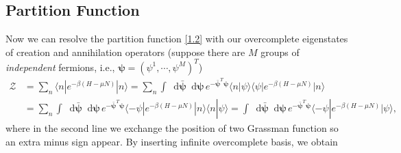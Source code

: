 \documentclass[10pt,nofootinbib]{revtex4}
\newcommand*\dd{\mathop{}\!\mathrm{d}}
\begin{document}
	\subsection{Partition Function}
	Now we can resolve the partition function \eqref{1.2} with our overcomplete eigenstates of creation and annihilation operators (suppose there are $M$ groups of \emph{independent} fermions, i.e., $\bm{\psi}=(\psi^1,\cdots,\psi^M)^T$)
	\begin{align*}
		\mathcal{Z}&=\sum_n\langle n|e^{-\beta(H-\mu N)}|n\rangle=\sum_n\int\dd\bm{\bar\psi}\dd\bm{\psi}\,e^{-\bm{\bar\psi}^T\bm{\psi}}\langle n|\psi\rangle\langle\psi|e^{-\beta(H-\mu N)}|n\rangle\\
		&=\sum_n\int\dd\bm{\bar\psi}\dd\bm{\psi}\,e^{-\bm{\bar\psi}^T\bm{\psi}}\langle-\psi|e^{-\beta(H-\mu N)}|n\rangle\langle n|\psi\rangle=\int\dd\bm{\bar\psi}\dd\bm{\psi}\,e^{-\bm{\bar\psi}^T\bm{\psi}}\langle-\psi|e^{-\beta(H-\mu N)}|\psi\rangle,
	\end{align*}
	where in the second line we exchange the position of two Grassman function so an extra minus sign appear. By inserting infinite overcomplete basis, we obtain
\end{document}
